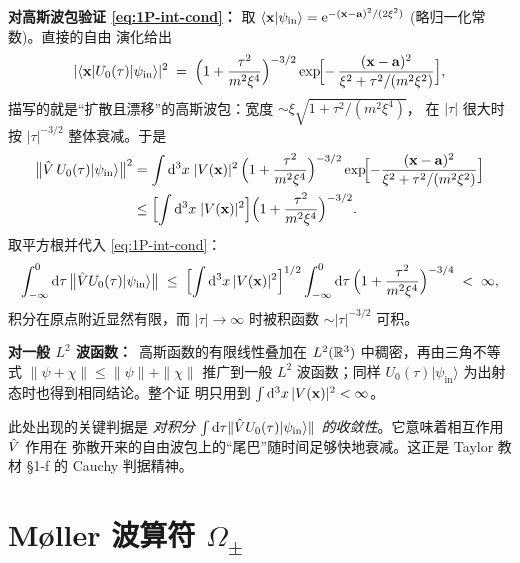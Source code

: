 \begin{proof*}
\textbf{对高斯波包验证 \eqref{eq:1P-int-cond}：}
取 $\langle \mathbf{x}|\psi_{\text{in}}\rangle =
\mathrm{e}^{-(\mathbf{x}-\mathbf{a})^2/(2\xi^2)}$ (略归一化常数)。直接的自由
演化给出
\begin{equation}
  |\langle \mathbf{x}|U_0(\tau)|\psi_{\text{in}}\rangle|^2
  \;=\; \Bigl(1 + \frac{\tau^2}{m^2\xi^4}\Bigr)^{-3/2}
        \exp\!\Bigl[-\,\frac{(\mathbf{x}-\mathbf{a})^2}{\xi^2 + \tau^2/(m^2\xi^2)}\Bigr],
  \label{eq:1P-gauss-spread}
\end{equation}
描写的就是“扩散且漂移”的高斯波包：宽度 $\sim\xi\sqrt{1+\tau^2/(m^2\xi^4)}$，
在 $|\tau|$ 很大时按 $|\tau|^{-3/2}$ 整体衰减。于是
\begin{align}
  \bigl\|\hat{V}\,U_0(\tau)|\psi_{\text{in}}\rangle\bigr\|^2
  &= \int \mathrm{d}^3x\;|V(\mathbf{x})|^2\,
     \Bigl(1+\frac{\tau^2}{m^2\xi^4}\Bigr)^{-3/2}
     \exp\!\Bigl[-\frac{(\mathbf{x}-\mathbf{a})^2}{\xi^2+\tau^2/(m^2\xi^2)}\Bigr]
  \nonumber\\
  &\le \Bigl[\int \mathrm{d}^3x\;|V(\mathbf{x})|^2\Bigr]
       \Bigl(1+\frac{\tau^2}{m^2\xi^4}\Bigr)^{-3/2}.
  \label{eq:1P-VU0-bound}
\end{align}
取平方根并代入 \eqref{eq:1P-int-cond}：
\begin{equation}
  \int_{-\infty}^{0}\mathrm{d}\tau\,\bigl\|\hat{V} U_0(\tau)|\psi_{\text{in}}\rangle\bigr\|
  \;\le\;\Bigl[\int \mathrm{d}^3x\,|V(\mathbf{x})|^2\Bigr]^{1/2}
        \int_{-\infty}^{0}\mathrm{d}\tau\,\Bigl(1+\frac{\tau^2}{m^2\xi^4}\Bigr)^{-3/4}
  \;<\;\infty,
  \label{eq:1P-int-finite}
\end{equation}
积分在原点附近显然有限，而 $|\tau|\to\infty$ 时被积函数 $\sim
|\tau|^{-3/2}$ 可积。

\textbf{对一般 $L^2$ 波函数：}\,
高斯函数的有限线性叠加在 $L^2(\mathbb{R}^3)$ 中稠密，再由三角不等式
$\|\psi+\chi\|\le\|\psi\|+\|\chi\|$ 推广到一般 $L^2$ 波函数；同样
$U_0(\tau)|\psi_{\text{in}}\rangle$ 为出射态时也得到相同结论。整个证
明只用到 $\int \mathrm{d}^3x\,|V(\mathbf{x})|^2<\infty$。
\end{proof*}

\begin{remark}
此处出现的关键判据是 \emph{对积分 $\int\mathrm{d}\tau \|\hat{V} U_0(\tau)
|\psi_{\text{in}}\rangle\|$ 的收敛性}。它意味着相互作用 $\hat{V}$ 作用在
弥散开来的自由波包上的“尾巴”随时间足够快地衰减。这正是 Taylor 教材
\S 1\hbox{-}f 的 Cauchy 判据精神。
\end{remark}

\section{Møller 波算符 $\Omega_\pm$}
\label{sec:1P-Moller}

